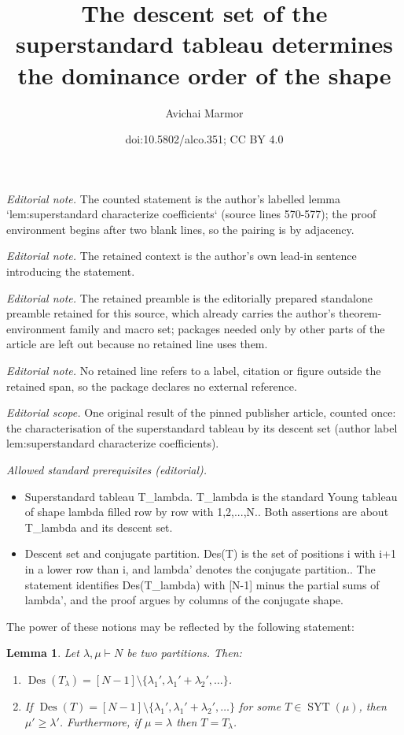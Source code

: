 \documentclass[11pt]{article}
\title{The descent set of the superstandard tableau determines the dominance order of the shape}
\author{Avichai Marmor}
\date{doi:10.5802/alco.351; CC BY 4.0}
\newtheorem{lemma}[theo]{Lemma}
\theoremstyle{definition}
\numberwithin{equation}{section}
\newcommand{\Des}{\operatorname{Des}}
\newcommand{\Syt}{\operatorname{SYT}}
\begin{document}
\maketitle
\noindent\textit{Editorial note.} The counted statement is the author's labelled lemma `lem:superstandard characterize coefficients` (source lines 570-577); the proof environment begins after two blank lines, so the pairing is by adjacency.\par\medskip
\noindent\textit{Editorial note.} The retained context is the author's own lead-in sentence introducing the statement.\par\medskip
\noindent\textit{Editorial note.} The retained preamble is the editorially prepared standalone preamble retained for this source, which already carries the author's theorem-environment family and macro set; packages needed only by other parts of the article are left out because no retained line uses them.\par\medskip
\noindent\textit{Editorial note.} No retained line refers to a label, citation or figure outside the retained span, so the package declares no external reference.\par\medskip
\noindent\textit{Editorial scope.} One original result of the pinned publisher article, counted once: the characterisation of the superstandard tableau by its descent set (author label lem:superstandard characterize coefficients).\par\medskip
\noindent\textit{Allowed standard prerequisites (editorial).}\begin{itemize}
\item Superstandard tableau T\_lambda. T\_lambda is the standard Young tableau of shape lambda filled row by row with 1,2,...,N.. Both assertions are about T\_lambda and its descent set.
\item Descent set and conjugate partition. Des(T) is the set of positions i with i+1 in a lower row than i, and lambda' denotes the conjugate partition.. The statement identifies Des(T\_lambda) with [N-1] minus the partial sums of lambda', and the proof argues by columns of the conjugate shape.
\end{itemize}\medskip
The power of these notions may be reflected by the following statement:

\begin{lemma}
\label{lem:superstandard characterize coefficients}
    Let $\lambda, \mu \vdash N$ be two partitions. Then:
    \begin{enumerate}
        \item $\Des(T_\lambda) = [N-1] \setminus \{\lambda_{1}', \lambda_{1}'+\lambda_{2}', \dots\}$.
        \item If $\Des(T) = [N-1] \setminus \{\lambda_{1}', \lambda_{1}'+\lambda_{2}', \dots\}$ for some $T \in \Syt(\mu)$, then $\mu' \ge \lambda'$. Furthermore, if $\mu = \lambda$ then $T = T_\lambda$.
    \end{enumerate}
\end{lemma}
\end{document}
